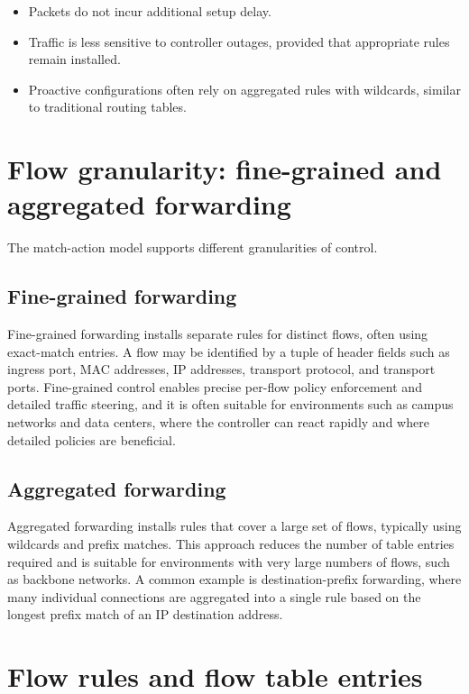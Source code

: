 \documentclass[11pt,a4paper,openany]{report}
\begin{document}
\begin{itemize}
\item Packets do not incur additional setup delay.
\item Traffic is less sensitive to controller outages, provided that appropriate rules remain installed.
\item Proactive configurations often rely on aggregated rules with wildcards, similar to traditional routing tables.
\end{itemize}

\section{Flow granularity: fine-grained and aggregated forwarding}

The match-action model supports different granularities of control.

\subsection{Fine-grained forwarding}

Fine-grained forwarding installs separate rules for distinct flows, often using exact-match entries. A flow may be identified by a tuple of header fields such as ingress port, MAC addresses, IP addresses, transport protocol, and transport ports. Fine-grained control enables precise per-flow policy enforcement and detailed traffic steering, and it is often suitable for environments such as campus networks and data centers, where the controller can react rapidly and where detailed policies are beneficial.

\subsection{Aggregated forwarding}

Aggregated forwarding installs rules that cover a large set of flows, typically using wildcards and prefix matches. This approach reduces the number of table entries required and is suitable for environments with very large numbers of flows, such as backbone networks. A common example is destination-prefix forwarding, where many individual connections are aggregated into a single rule based on the longest prefix match of an IP destination address.

\section{Flow rules and flow table entries}
\end{document}
